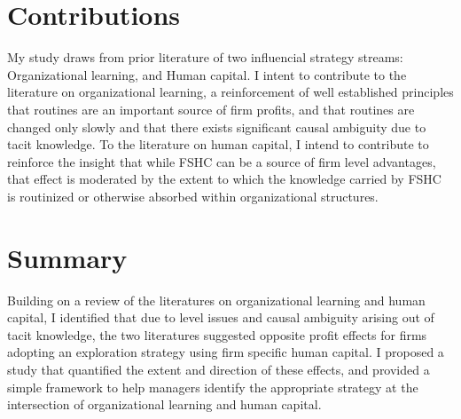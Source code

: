 \documentclass[12pt,letterpaper]{article}
\begin{document}
\section{Contributions}
My study draws from prior literature of two influencial strategy streams: Organizational learning, and Human capital. I intent to contribute to the literature on organizational learning, a reinforcement of well established principles that routines are an important source of firm profits, and that routines are changed only slowly and that there exists significant causal ambiguity due to tacit knowledge. To the literature on human capital, I intend to contribute to reinforce the insight that while FSHC can be a source of firm level advantages, that effect is moderated by the extent to which the knowledge carried by FSHC is routinized or otherwise absorbed within organizational structures.


\section{Summary}
Building on a review of the literatures on organizational learning and human capital, I identified that due to level issues and causal ambiguity arising out of tacit knowledge, the two literatures suggested opposite profit effects for firms adopting an exploration strategy using firm specific human capital. I proposed a study that quantified the extent and direction of these effects, and provided a simple framework to help managers identify the appropriate strategy at the intersection of organizational learning and human capital.


\begin{singlespace}
\renewcommand{\refname}{REFERENCES}
 

\end{singlespace}
\end{document}
